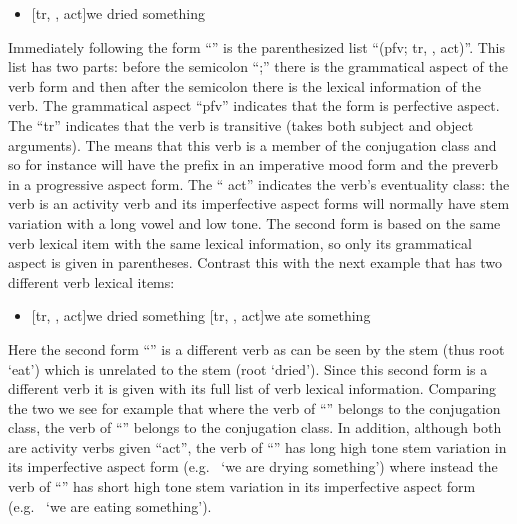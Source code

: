 \begin{itemize}
\item	{}[tr, ,  act]{we dried something}
	\versus {}
\end{itemize}

Immediately following the form “” is the parenthesized list “(pfv; tr, ,  act)”.
This list has two parts: before the semicolon “;” there is the grammatical aspect of the verb form and then after the semicolon there is the lexical information of the verb.
The grammatical aspect “pfv” indicates that the form is perfective aspect.
The “tr” indicates that the verb is transitive (takes both subject and object arguments).
The  means that this verb is a member of the  conjugation class and so for instance will have the prefix  in an imperative mood form and the preverb  in a progressive aspect form.
The “ act” indicates the verb’s eventuality class: the verb is an activity verb and its imperfective aspect forms will normally have  stem variation with a long vowel and low tone.
The second form  is based on the same verb lexical item with the same lexical information, so only its grammatical aspect is given in parentheses.
Contrast this with the next example that has two different verb lexical items:

\begin{itemize}
\item	{}[tr, ,  act]{we dried something}
	\versus {}[tr, ,  act]{we ate something}
\end{itemize}

Here the second form “” is a different verb as can be seen by the stem  (thus root  ‘eat’) which is unrelated to the stem  (root  ‘dried’).
Since this second form is a different verb it is given with its full list of verb lexical information.
Comparing the two we see for example that where the verb of “” belongs to the  conjugation class, the verb of “” belongs to the  conjugation class.
In addition, although both are activity verbs given “act”, the verb of “” has  long high tone stem variation in its imperfective aspect form (e.g.\  ‘we are drying something’) where instead the verb of “” has  short high tone stem variation in its imperfective aspect form (e.g.\  ‘we are eating something’).

